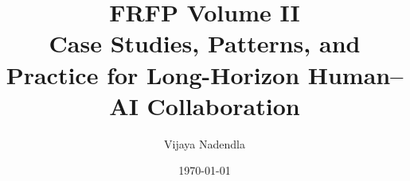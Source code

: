 \documentclass[11pt,oneside]{book}
\begin{document}

\frontmatter

\title{FRFP Volume II\\[0.5em]
  \large Case Studies, Patterns, and Practice for Long-Horizon Human--AI Collaboration}
\author{Vijaya Nadendla}
\date{\today}
\maketitle

\tableofcontents


\mainmatter


\label{ch:frfp-plain-language}


%

%



%
\end{document}
